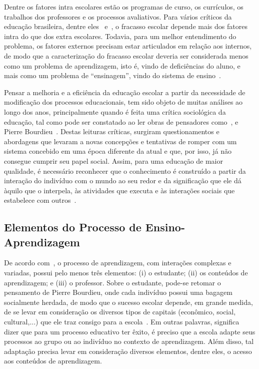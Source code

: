 Dentre os fatores intra escolares estão os programas de curso, os currículos, os trabalhos dos professores e os processos avaliativos. Para vários críticos da educação brasileira, dentre eles~\cite{Collares:1989} e~\cite{Perrenoud:2001}, o fracasso escolar depende mais dos fatores intra do que dos extra escolares. Todavia, para um melhor entendimento do problema, os fatores externos precisam estar articulados em relação aos internos, de modo que a caracterização do fracasso escolar deveria ser considerada menos como um problema de aprendizagem, isto é, vindo de deficiências do aluno, e mais como um problema de ``ensinagem'', vindo do sistema de ensino~\citep{Collares:1989}.

Pensar a melhoria e a eficiência da educação escolar a partir da necessidade de modificação dos processos educacionais, tem sido objeto de muitas análises ao longo dos anos, principalmente quando é feita uma crítica sociológica da educação, tal como pode ser constatado ao ler obras de pensadores como~\cite{charlot:2000}, \cite{Freire:1987} e Pierre Bourdieu~\citep{Nogueira:2013}. Destas leituras críticas, surgiram questionamentos e abordagens que levaram a novas concepções e tentativas de romper com um sistema concebido em uma época diferente da atual e que, por isso, já não consegue cumprir seu papel social. Assim, para uma educação de maior qualidade, é necessário reconhecer que o conhecimento é construído a partir da interação do indivíduo com o mundo ao seu redor e da significação que ele dá àquilo que o interpela, às atividades que executa e às interações sociais que estabelece com outros~\citep{charlot:2000}.

\subsection{Elementos do Processo de Ensino-Aprendizagem}

De acordo com~\cite{bassedas:1996}, o processo de aprendizagem, com interações complexas e variadas, possui pelo menos três elementos: (i) o estudante; (ii) os conteúdos de aprendizagem; e (iii) o professor. Sobre o estudante, pode-se retomar o pensamento de Pierre Bourdieu, onde cada indivíduo possui uma bagagem socialmente herdada, de modo que o sucesso escolar depende, em grande medida, de se levar em consideração os diversos tipos de capitais (econômico, social, cultural,...) que ele traz consigo para a escola~\citep{Nogueira:2013}. Em outras palavras, significa dizer que para um processo educativo ter êxito, é preciso que a escola adapte seus processos ao grupo ou ao indivíduo no contexto de aprendizagem. Além disso, tal adaptação precisa levar em consideração diversos elementos, dentre eles, o acesso aos conteúdos de aprendizagem.

